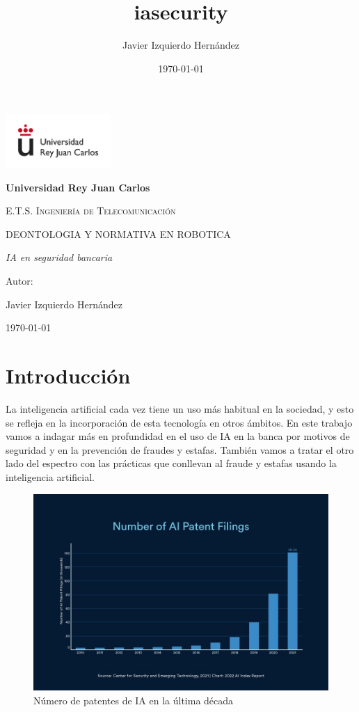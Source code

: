 \documentclass[12pt, a4paper]{report}
\title{iasecurity}
\author{Javier Izquierdo Hernández}
\date{\today}
\begin{document}
	\begin{titlepage}
		\centering
		{\includegraphics[width=0.3\textwidth]{logo}\par}
		\vspace{1cm}
		{\bfseries\LARGE Universidad Rey Juan Carlos \par}
		\vspace{1cm}
		{\scshape\Large E.T.S. Ingeniería de Telecomunicación \par}
		\vspace{3cm}
		{\scshape\Huge DEONTOLOGIA Y NORMATIVA EN ROBOTICA  \par}
		\vspace{3cm}
		{\itshape\Large IA en seguridad bancaria \par}
		\vfill
		{\Large Autor: \par}
		{\Large Javier Izquierdo Hernández \par}
		\vfill
		{\Large \today \par}
	\end{titlepage}

\newpage
\renewcommand{\contentsname}{Contenidos}
\tableofcontents
\listoffigures
\newpage
\chapter{Introducción}
La inteligencia artificial cada vez tiene un uso más habitual en la sociedad, y esto se refleja en la incorporación de esta tecnología en otros ámbitos. En este trabajo vamos a indagar más en profundidad en el uso de IA en la banca por motivos de seguridad y en la prevención de fraudes y estafas. También vamos a tratar el otro lado del espectro con las prácticas que conllevan al fraude y estafas usando la inteligencia artificial.\\

\begin{figure}[h]
	\centering
	\includegraphics[width=\textwidth]{aipatents}
	\caption{Número de patentes de IA en la última década}
\end{figure}
\end{document}
